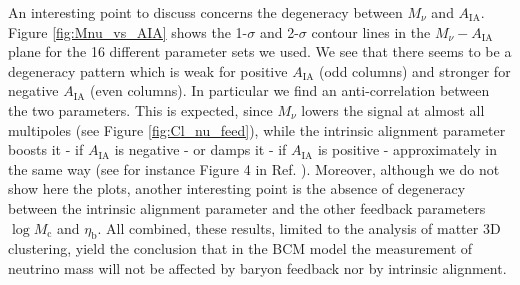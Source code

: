 \documentclass[a4paper,11pt]{article}
\begin{document}
An interesting point to discuss concerns the degeneracy between $M_\nu$ and $A_\mathrm{IA}$.
Figure \ref{fig:Mnu_vs_AIA} shows the 1-$\sigma$ and 2-$\sigma$ contour lines in the $M_\nu-A_\mathrm{IA}$ plane for the 16 different parameter sets we used.
We see that there seems to be a degeneracy pattern which is weak for positive $A_\mathrm{IA}$ (odd columns) and stronger for negative $A_\mathrm{IA}$ (even columns).
In particular we find an anti-correlation between the two parameters.
This is expected, since $M_\nu$ lowers the signal at almost all multipoles (see Figure \ref{fig:Cl_nu_feed}), while the intrinsic alignment parameter boosts it - if $A_\mathrm{IA}$ is negative - or damps it - if $A_\mathrm{IA}$ is positive - approximately in the same way (see for instance Figure 4 in Ref. \cite{Koh-KiDS+17}).
Moreover, although we do not show here the plots, another interesting point is the absence of degeneracy between the intrinsic alignment parameter and the other feedback parameters $\log M_\mathrm c$ and $\eta_\mathrm b$.
All combined, these results, limited to the analysis of matter 3D clustering, yield the conclusion that in the BCM model the measurement of neutrino mass will not be affected by baryon feedback nor by intrinsic alignment.
\end{document}
